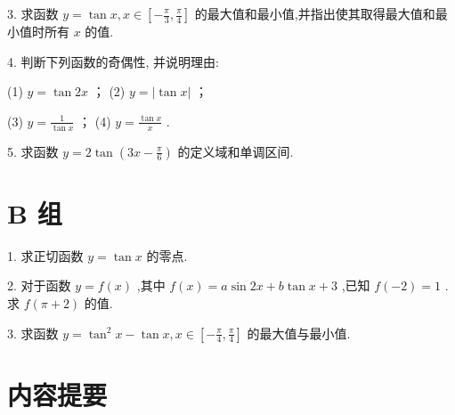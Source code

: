 \documentclass[10pt]{article}
\begin{document}
3. 求函数 \(y = \tan x,x \in  \left\lbrack  {-\frac{\pi }{3},\frac{\pi }{4}}\right\rbrack\) 的最大值和最小值,并指出使其取得最大值和最小值时所有 \(x\) 的值.

4. 判断下列函数的奇偶性, 并说明理由:

(1) \(y = \tan {2x}\) ； (2) \(y = \left| {\tan x}\right|\) ；

(3) \(y = \frac{1}{\tan x}\) ； (4) \(y = \frac{\tan x}{x}\) .

5. 求函数 \(y = 2\tan \left( {{3x} - \frac{\pi }{6}}\right)\) 的定义域和单调区间.

\section*{B 组}

1. 求正切函数 \(y = \tan x\) 的零点.

2. 对于函数 \(y = f\left( x\right)\) ,其中 \(f\left( x\right)  = a\sin {2x} + b\tan x + 3\) ,已知 \(f\left( {-2}\right)  = 1\) . 求 \(f\left( {\pi  + 2}\right)\) 的值.

3. 求函数 \(y = {\tan }^{2}x - \tan x,x \in  \left\lbrack  {-\frac{\pi }{4},\frac{\pi }{4}}\right\rbrack\) 的最大值与最小值.

\section*{内容提要}
\end{document}
